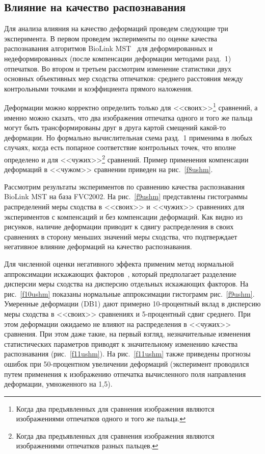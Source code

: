 \begin{multicols}{2}
     \section{Влияние на качество распознавания}
      
      Для анализа влияния на качество деформаций проведем следующие три 
эксперимента. В первом проведем эксперименты по оценке качества распознавания 
алгоритмов BioLink MST~\cite{15ushm} для деформированных и недеформированных 
(после компенсации деформации методами разд.~1) отпечатков. Во втором и третьем 
рассмотрим изменение статистики двух основных объективных мер сходства отпечатков: 
среднего расстояния между контрольными точками и коэффициента прямого наложения.

      
      Деформации можно корректно определить только для <<своих>>\footnote{Когда 
два предъявленных для сравнения изображения являются изображениями отпечатков 
одного и того же пальца.} сравнений, а именно можно сказать, что два изображения 
отпечатка одного и того же пальца могут быть трансформированы друг в друга картой 
смещений какой-то деформации. Но формально вычислительная схема разд.~1 применима 
в любых случаях, когда есть попарное соответствие контрольных точек, что вполне 
определено и для <<чужих>>\footnote{Когда два предъявленных для сравнения 
изображения являются изображениями отпечатков разных пальцев.} сравнений. Пример 
применения компенсации деформаций в <<чужом>> сравнении приведен на 
рис.~\ref{f8ushm}. 

      
      Рассмотрим результаты экспериментов по сравнению качества распознавания 
\mbox{BioLink} MST на база FVC2002. На рис.~\ref{f9ushm} представлены гистограммы 
распределений меры сходства в <<своих>> и <<чужих>> сравнениях для экспериментов с 
компенсаций и без компенсации деформаций. Как видно из рисунков, наличие 
деформации приводит к сдвигу распределения в своих сравнениях в сторону меньших 
значений меры сходства, что подтверждает негативное влияние деформаций на качество 
распознавания.
   

      Для численной оценки негативного эффекта применим метод нормальной 
аппроксимации искажающих факторов~\cite{16ushm, 17ushm}, который предполагает 
разделение дис\-пер\-сии меры сходства на дис\-пер\-сию отдельных искажающих факторов. На 
рис.~\ref{f10ushm} показаны нормальные аппроксимации гистограмм рис.~\ref{f9ushm}. 
Умеренные деформации (DB1) дают примерно 10-процентный вклад в дисперсию меры сходства в 
<<своих>> сравнениях и 5-процентный сдвиг среднего. При этом деформации ожидаемо не влияют 
на распределения в <<чужих>> сравнения. При этом даже такие, на первый взгляд, 
незначительные изменения статистических параметров приводят к значительному 
изменению качества распознавания (рис.~\ref{f11ushm}). На рис.~\ref{f11ushm} также 
приведены прогнозы ошибок при 50-процентном увеличении деформаций (эксперимент проводился 
путем применения к 
изображению отпечатка вычисленного поля на\-прав\-ле\-ния деформации, умноженного на 1,5). 

\end{multicols}

